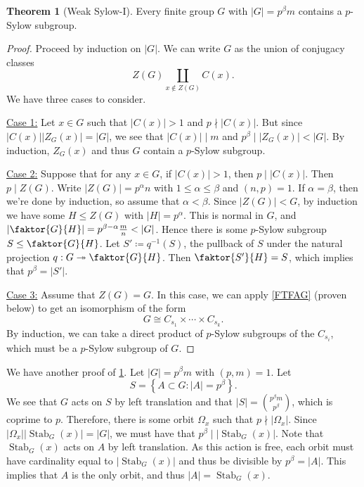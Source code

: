 \documentclass[10pt,letterpaper,cm]{nupset}
\theoremstyle{definition}
\theoremstyle{theorem}
\newtheorem{theorem}[definition]{Theorem}
\theoremstyle{remark}
\newcommand{\1}{\mathbf{1}}
\newcommand{\0}{\vec 0}
\DeclareMathOperator{\stab}{Stab}
\begin{document}
\begin{theorem}[Weak Sylow-I]\label{ws1}
Every finite group $G$ with $\lvert{G}\rvert = p^{\beta}m$ contains a $p$-Sylow subgroup.
\end{theorem}
\begin{proof}
Proceed by induction on $\lvert{G}\rvert$. We can write $G$ as the union of conjugacy classes $$Z(G) \coprod_{x\notin Z(G)} C(x).$$ We have three cases to consider.

\smallskip

 \underline{Case 1:} Let $x\in G$ such that $\lvert{C(x)}\rvert>1$ and $p\nmid \lvert{C(x)}\rvert$. But since $\lvert{C(x)}\rvert\lvert{Z_G(x)}\rvert =\lvert{G}\rvert$, we see that $\lvert{C(x)}\rvert \mid m$ and $p^{\beta}\mid \lvert{Z_G(x)}\rvert< \lvert{G}\rvert$. By induction, $Z_G(x)$ and thus $G$ contain a $p$-Sylow subgroup.

\medskip

 \underline{Case 2:}
 Suppose that for any $x\in G$, if $\lvert{C(x)}\rvert >1$, then $p\mid \lvert{C(x)}\rvert$. Then $p\mid Z(G)$. Write $\lvert{Z(G)}\rvert = p^{\alpha}n$ with $1\leq \alpha\leq \beta$ and $(n, p)=1$. If $\alpha = \beta$, then we're done by induction, so assume that $\alpha <
 \beta$. Since $\lvert{Z(G)}\rvert < G$, by induction we have some $H\leq Z(G)$ with $\lvert{H}\rvert = p^{\alpha}$. This is normal in $G$, and $\lvert{\faktor{G}{H}}\rvert = p^{\beta - \alpha}\frac{m}{n} < \lvert{G}\rvert$. Hence there is some $p$-Sylow subgroup $S\leq \faktor{G}{H}$.  Let $S'\coloneqq q^{-1}(S)$, the pullback of $S$ under the natural projection $q: G\twoheadrightarrow \faktor{G}{H}$.  Then $\faktor{S'}{H} =S$, which implies that $p^{\beta}= \lvert{S'}\rvert$. 

\medskip

 \underline{Case 3:} Assume that $Z(G) = G$. In this case, we can apply \cref{FTFAG} (proven below) to get an isomorphism of the form 
 \[
 G \cong C_{s_1}\times \cdots \times C_{s_k}.
 \] By induction, we can take a direct product of $p$-Sylow subgroups of the $C_{s_i}$, which must be a $p$-Sylow subgroup of $G$.
\end{proof}

\smallskip

We have another proof of \cref{ws1}. Let $\lvert{G}\rvert = p^{\beta}m$ with $(p, m) =1$. Let $$ S = \left\{A\subset G : \lvert{A}\rvert = p^{\beta}\right\}.$$ We see that $G$ acts on $S$ by left translation and that $\lvert{S}\rvert = {p^{\beta}m \choose p^{\beta}}$, which is coprime to $p$. Therefore, there is some orbit $\Omega_x$ such that $p \nmid  \lvert{\Omega_x}\rvert$. Since $\lvert{\Omega_x}\rvert \lvert{\stab_G(x)}\rvert = \lvert{G}\rvert$, we must have that $p^{\beta} \mid \lvert{\stab_G(x)}\rvert$. Note that $\stab_G(x)$ acts on $A$ by left translation. As this action is free, each orbit must have cardinality equal to $\lvert{\stab_G(x)}\rvert$ and thus be divisible by $p^{\beta} =\lvert{A}\rvert$. This implies that $A$ is the only orbit, and thus $\lvert{A}\rvert = \stab_G(x)$.
\end{document}
